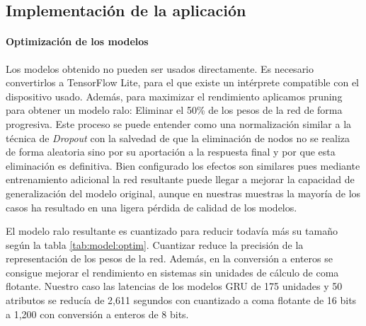\documentclass[11pt,a4paper,spanish,twocolumn]{article}
\begin{document}
\subsection{Implementación de la aplicación}

\paragraph{Optimización de los modelos}
Los modelos obtenido no pueden ser usados directamente. Es necesario convertirlos a TensorFlow Lite, para el que existe un intérprete compatible con el dispositivo usado. Además, para maximizar el rendimiento aplicamos pruning para obtener un modelo ralo: Eliminar el 50\% de los pesos de la red de forma progresiva. Este proceso se puede entender como una normalización similar a la técnica de \textit{Dropout} con la salvedad de que la eliminación de nodos no se realiza de forma aleatoria sino por su aportación a la respuesta final y por que esta eliminación es definitiva. Bien configurado los efectos son similares pues mediante entrenamiento adicional la red resultante puede llegar a mejorar la capacidad de generalización del modelo original\cite{Cai2020}, aunque en nuestras muestras la mayoría de los casos ha resultado en una ligera pérdida de calidad de los modelos.

El modelo ralo resultante es cuantizado para reducir todavía más su tamaño según la tabla \ref{tab:model:optim}. Cuantizar reduce la precisión de la representación de los pesos de la red. Además, en la conversión a enteros se consigue mejorar el rendimiento en sistemas sin unidades de cálculo de coma flotante. Nuestro caso las latencias de los modelos GRU de 175 unidades y 50 atributos se reducía de 2,611 segundos con cuantizado a coma flotante de 16 bits a 1,200 con conversión a enteros de 8 bits.

\begin{table}\caption{\label{tab:model:optim} Reducción del tamaño del modelo en MBytes con cada técnica de optmización}
\end{table}
\end{document}
